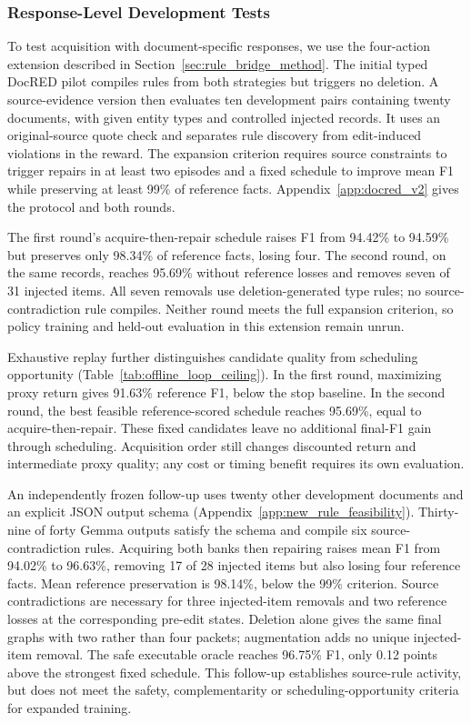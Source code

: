 \subsubsection{Response-Level Development Tests}
\label{subsec:source_development}
To test acquisition with document-specific responses, we use the four-action
extension described in Section~\ref{sec:rule_bridge_method}. The initial typed
DocRED pilot compiles rules from both strategies but triggers no deletion.
A source-evidence version then evaluates ten development pairs containing
twenty documents, with given entity types and controlled injected records.
It uses an original-source quote check and separates rule discovery from
edit-induced violations in the reward. The expansion criterion requires
source constraints to trigger repairs in at least two episodes and a fixed
schedule to improve mean F1 while preserving at least 99\% of reference facts.
Appendix~\ref{app:docred_v2} gives the protocol and both rounds.

The first round's acquire-then-repair schedule raises F1 from 94.42\% to
94.59\% but preserves only 98.34\% of reference facts, losing four. The second round, on the same
records, reaches 95.69\% without reference losses and removes seven of
31 injected items. All seven removals use deletion-generated type rules;
no source-contradiction rule compiles. Neither round meets the full expansion
criterion, so policy training and held-out evaluation in this extension
remain unrun.

Exhaustive replay further distinguishes candidate quality from scheduling
opportunity (Table~\ref{tab:offline_loop_ceiling}). In the first round,
maximizing proxy return gives 91.63\% reference F1, below the stop baseline.
In the second round, the best feasible reference-scored schedule reaches
95.69\%, equal to acquire-then-repair. These fixed candidates leave no
additional final-F1 gain through scheduling. Acquisition order still changes
discounted return and intermediate proxy quality; any cost or timing benefit
requires its own evaluation.

An independently frozen follow-up uses twenty other development documents
and an explicit JSON output schema (Appendix~\ref{app:new_rule_feasibility}).
Thirty-nine of forty Gemma outputs satisfy the schema and compile six
source-contradiction rules. Acquiring both banks then repairing raises mean
F1 from 94.02\% to 96.63\%, removing 17 of 28 injected items but also losing
four reference facts. Mean reference preservation is 98.14\%, below the
99\% criterion. Source contradictions are necessary for three injected-item
removals and two reference losses at the corresponding pre-edit states.
Deletion alone gives the same final graphs with two rather than four packets;
augmentation adds no unique injected-item removal. The safe executable
oracle reaches 96.75\% F1, only 0.12 points above the strongest fixed schedule.
This follow-up establishes source-rule activity, but does not meet the safety,
complementarity or scheduling-opportunity criteria for expanded training.

